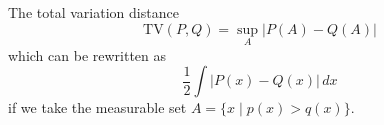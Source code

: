   \begin{definition}
    \label{def:total-variation-distance}
    The total variation distance
    \begin{equation}
      \mathrm{TV}(P, Q) = \sup_{A} | P(A) - Q(A) | 
    \end{equation}
    which can be rewritten as 
    \begin{equation}
      \frac{1}{2} \int |P(x) - Q(x)| \,dx
    \end{equation}
    if we take the measurable set $A = \{x \mid p(x) > q(x) \}$. 
  \end{definition}
